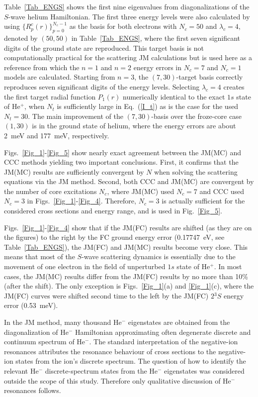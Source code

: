 \documentclass[aip
, pra
, showpacs
, aps
, twocolumn
, groupedaddress
, floatfix
]{revtex4}
\begin{document}
Table~\ref{Tab_ENGS} shows the first nine eigenvalues from diagonalizations of the $S$-wave helium Hamiltonian.
The first three energy levels were also calculated by using
$\{R^{c}_p(r)\}_{p=0}^{N_c-1}$ as the basis for both electrons with $N_c=50$ and $\lambda_c=4$, denoted by $(50,50)$ in Table~\ref{Tab_ENGS},
where the first seven significant digits of the ground state \cite{G94} are reproduced.
This target basis is not computationally practical for the scattering JM calculations but is used here
as a reference from which the $n=1$ and $n=2$ energy errors in $N_c=7$ and $N_c=1$ models are calculated.
Starting from $n=3$, the $(7,30)$-target basis correctly reproduces seven significant digits \cite{DHIF94} of the energy levels.
Selecting $\lambda_c=4$ creates the first target radial function $P_1(r)$ numerically identical to the exact $1s$ state of He$^+$,
when $N_t$ is sufficiently large in Eq.~(\ref{I_t}) as is the case for the used $N_t=30$.
The main improvement of the $(7,30)$-basis over the froze-core case $(1,30)$ is in the ground state of helium, 
where the energy errors are about 2~meV and 177~meV, respectively.



Figs.~\ref{Fig_1}-\ref{Fig_5} show nearly exact agreement between the JM(MC) and CCC methods yielding two important conclusions.
First, it confirms that the JM(MC) results are sufficiently convergent by $N$ when solving the scattering equations via the JM method.
Second, both CCC and JM(MC) are convergent by the number of core excitations $N_c$,
where JM(MC) used $N_c=7$ and CCC used $N_c=3$ in Figs.~\ref{Fig_1}-\ref{Fig_4}.
Therefore, $N_c=3$ is actually sufficient for the considered cross sections and energy range, and is used in Fig.~\ref{Fig_5}.


Figs.~\ref{Fig_1}-\ref{Fig_4} show that if the JM(FC) results are shifted (as they are on the figures)
to the right by the FC ground energy error (0.17747~eV, see Table~\ref{Tab_ENGS}),
the JM(FC) and JM(MC) results become very close.
This means that most of the $S$-wave scattering dynamics  is essentially due to
the movement of one electron in the field of unperturbed $1s$ state of He$^+$.
In most cases, the JM(MC) results differ from the JM(FC) results by no more than 10\% (after the shift).
The only exception is Figs.~\ref{Fig_1}(a) and \ref{Fig_1}(c), where the JM(FC) curves were shifted second time to the left by
the JM(FC) $2{^3S}$ energy error (0.53~meV).


In the JM method, many thousand He$^-$ eigenstates are obtained from the diagonalization of He$^-$ Hamiltonian 
approximating often degenerate discrete and continuum spectrum of He$^-$. 
The standard interpretation of the negative-ion resonances \cite{BC94} attributes the resonance behaviour of cross sections to
the negative-ion states from the ion's discrete spectrum.
The question of how to identify the relevant He$^-$ discrete-spectrum states from the He$^-$ eigenstates 
was considered outside the scope of this study. Therefore only qualitative discussion of He$^-$ resonances follows. 
\end{document}
